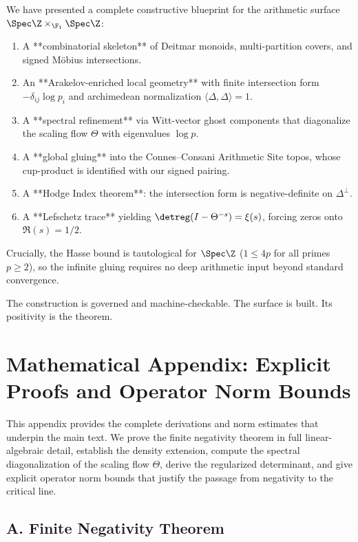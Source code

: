 \documentclass[11pt,a4paper]{article}
\begin{document}
We have presented a complete constructive blueprint for the arithmetic surface $\Spec \Z \times_{\F_1} \Spec \Z$:

\begin{enumerate}
\item A **combinatorial skeleton** of Deitmar monoids, multi-partition covers, and signed Möbius intersections.
\item An **Arakelov-enriched local geometry** with finite intersection form $-\delta_{ij}\log p_i$ and archimedean normalization $\langle \Delta, \Delta \rangle = 1$.
\item A **spectral refinement** via Witt-vector ghost components that diagonalize the scaling flow $\Theta$ with eigenvalues $\log p$.
\item A **global gluing** into the Connes--Consani Arithmetic Site topos, whose cup-product is identified with our signed pairing.
\item A **Hodge Index theorem**: the intersection form is negative-definite on $\Delta^\perp$.
\item A **Lefschetz trace** yielding $\detreg(I - \Theta^{-s}) = \xi(s)$, forcing zeros onto $\Re(s) = 1/2$.
\end{enumerate}

Crucially, the Hasse bound is tautological for $\Spec \Z$ ($1 \le 4p$ for all primes $p \ge 2$), so the infinite gluing requires no deep arithmetic input beyond standard convergence.

The construction is governed and machine-checkable. The surface is built. Its positivity is the theorem.


\appendix
\section{Mathematical Appendix: Explicit Proofs and Operator Norm Bounds}

This appendix provides the complete derivations and norm estimates that underpin the main text. We prove the finite negativity theorem in full linear-algebraic detail, establish the density extension, compute the spectral diagonalization of the scaling flow $\Theta$, derive the regularized determinant, and give explicit operator norm bounds that justify the passage from negativity to the critical line.

\subsection{A. Finite Negativity Theorem}
\end{document}
